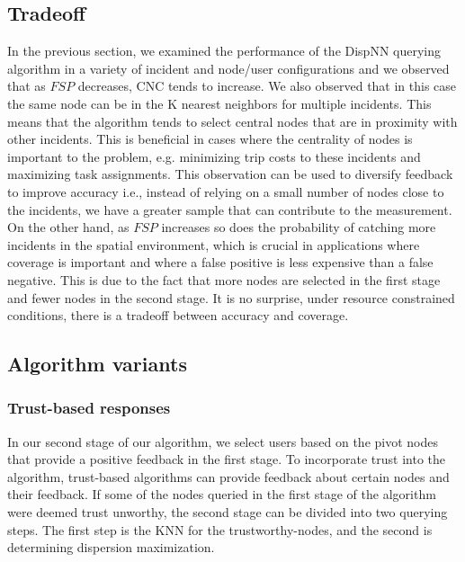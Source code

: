\documentclass{acm_proc_article-sp}
\begin{document}
\subsection{Tradeoff}
In the previous section, we examined the performance of the DispNN querying algorithm in a variety of incident and node/user configurations and we observed that as $FSP$ decreases, CNC tends to increase. We also observed that in this case the same node can be in the K nearest neighbors for multiple incidents. This means that the algorithm tends to select central nodes that are in proximity with other incidents. This is beneficial in cases where the centrality of nodes is important to the problem, e.g. minimizing trip costs to these incidents and maximizing task assignments. This observation can be used to diversify feedback to improve accuracy i.e., instead of relying on a small number of nodes close to the incidents, we have a greater sample that can contribute to the measurement.
On the other hand, as $FSP$ increases so does the probability of catching more incidents in the spatial environment, which is crucial in applications where coverage is important and where a false positive is less expensive than a false negative. This is due to the fact that more nodes are selected in the first stage and fewer nodes in the second stage. It is no surprise, under resource constrained conditions, there is a tradeoff between accuracy and coverage.

\subsection{Algorithm variants}
\subsubsection{Trust-based responses}
In our second stage of our algorithm, we select users based on the pivot nodes that provide a positive feedback in the first stage. To incorporate trust into the algorithm, trust-based algorithms can provide feedback about certain nodes and their feedback. If some of the nodes queried in the first stage of the algorithm were deemed trust unworthy, the second stage can be divided into two querying steps. The first step is the KNN for the trustworthy-nodes, and the second is determining dispersion maximization.
\end{document}
